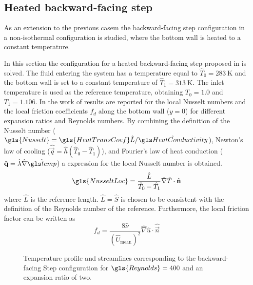 
\subsection{Heated backward-facing step}\label{ssec:HeatedBackwardFacingStep}


As an extension to the previous casem the backward-facing step configuration in a non-isothermal configuration is studied, where the bottom wall is heated to a constant temperature. 


In this section the configuration for a heated backward-facing step proposed in \textcite{xieFluidFlowHeat2016} is solved. 
The fluid entering the system has a temperature equal to $\hat T_0 = \SI{283}{\kelvin}$ and the bottom wall is set to a constant temperature of $\hat T_1 =\SI{313}{\kelvin}$. The inlet temperature is used as the reference temperature, obtaining $T_0 = 1.0$ and $T_1 = 1.106$.
In the work of \textcite{xieFluidFlowHeat2016} results are reported for the local Nusselt numbers and the local friction coefficients $f_d$  along the bottom wall ($y = 0$) for different expansion ratios and Reynolds numbers.
By combining the definition of the Nusselt number ($\gls{Nusselt} = \gls{HeatTransCoef}\hat{L}/\glsHat{HeatConductivity}$), Newton's law of cooling ($\hat{\vec{q}} = \hat{h} (\hat{T}_0 - \hat{T}_1 )$), and Fourier's law of heat conduction ($\hat{\vec{q}} = \hat \lambda \hat{\nabla} \glsHat{temp}$) a expression for the local Nusselt number is obtained.
\begin{equation}
	\gls{NusseltLoc} = \frac{\hat L}{\hat T_0-\hat T_1}\hat \nabla \hat T \cdot \hat {\vec{n}}
\end{equation}
where $\hat L$ is the reference length. $ \hat L = \hat S$ is chosen to be consistent with the definition of the Reynolds number of the reference. Furthermore, the local friction factor can be written as %
\begin{equation}
	f_d = \frac{8\hat \nu} { (\hat U_{\text{mean}})^2}  \hat \nabla \hat u \cdot \hat {\vec{n}}
\end{equation}

\begin{figure}[t]
	\centering
	\pgfplotsset{width=0.81\textwidth, compat=1.3}
	\caption{Temperature profile and streamlines corresponding to the backward-facing Step configuration for $\gls{Reynolds} = 400$ and an expansion ratio of two.} \label{fig:BFS_Temperature_Streamlines}
\end{figure}

